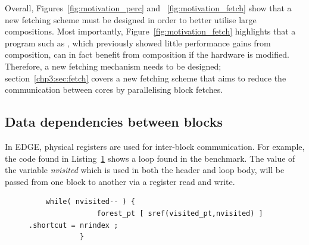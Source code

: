 Overall, Figures~\ref{fig:motivation_perc} and ~\ref{fig:motivation_fetch} show that a new fetching scheme must be designed in order to better utilise large compositions.
Most importantly, Figure~\ref{fig:motivation_fetch} highlights that a program such as , which previously showed little performance gains from composition, can in fact benefit from composition if the hardware is modified.
Therefore, a new fetching mechanism needs to be designed; section~\ref{chp3:sec:fetch} covers a new fetching scheme that aims to reduce the communication between cores by parallelising block fetches.

\subsection{Data dependencies between blocks}

In EDGE, physical registers are used for inter-block communication.
For example, the code found in Listing~\ref{lst:mser_snipet} shows a loop found in the  benchmark.
The value of the variable \textit{nvisited} which is used in both the header and loop body, will be passed from one block to another via a register read and write.


\begin{figure}[t]
\lstset{language=C,numbersep=4pt}
\begin{center}
\begin{lstlisting}
	while( nvisited-- ) {
				forest_pt [ sref(visited_pt,nvisited) ] .shortcut = nrindex ;
			}
\end{lstlisting}
\end{center}
\vspace{-1em}
\label{lst:mser_snipet}
\vspace{1em}
\end{figure}

